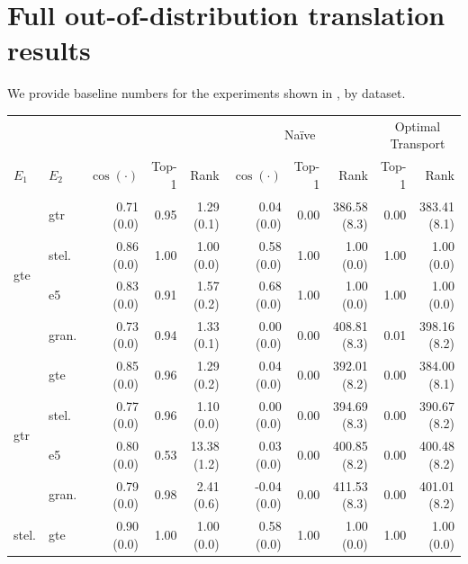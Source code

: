 \section{Full out-of-distribution translation results}
\label{sec:full_ood}
We provide baseline numbers for the experiments shown in , by dataset.
\begin{table}[!ht]
    \scriptsize
    \centering
    \begin{tabular}{llrrrrrrrr}
        \toprule
        \multicolumn{2}{c}{} & \multicolumn{3}{c}{\atk{}} & \multicolumn{3}{c}{Naïve} & \multicolumn{2}{c}{Optimal Transport}\\
        \cmidrule(lr){3-5} \cmidrule(lr){6-8}  \cmidrule(lr){9-10} 
        $E_1$ & $E_2$ & $\cos(\cdot)$ & Top-1 & Rank & $\cos(\cdot)$ & Top-1 & Rank & Top-1 & Rank\\
        \midrule
        \multirow{4}{*}{gte} & gtr & 0.71 {\tiny (0.0)} & 0.95 & 1.29 {\tiny (0.1)} & 0.04 {\tiny (0.0)} & 0.00 & 386.58 {\tiny (8.3)} & 0.00 & 383.41 {\tiny (8.1)} \\
        & stel. & 0.86 {\tiny (0.0)} & 1.00 & 1.00 {\tiny (0.0)} & 0.58 {\tiny (0.0)} & 1.00 & 1.00 {\tiny (0.0)} & 1.00 & 1.00 {\tiny (0.0)} \\
        & e5 & 0.83 {\tiny (0.0)} & 0.91 & 1.57 {\tiny (0.2)} & 0.68 {\tiny (0.0)} & 1.00 & 1.00 {\tiny (0.0)} & 1.00 & 1.00 {\tiny (0.0)} \\
        & gran. & 0.73 {\tiny (0.0)} & 0.94 & 1.33 {\tiny (0.1)} & 0.00 {\tiny (0.0)} & 0.00 & 408.81 {\tiny (8.3)} & 0.01 & 398.16 {\tiny (8.2)} \\
        \midrule
        \multirow{4}{*}{gtr} & gte & 0.85 {\tiny (0.0)} & 0.96 & 1.29 {\tiny (0.2)} & 0.04 {\tiny (0.0)} & 0.00 & 392.01 {\tiny (8.2)} & 0.00 & 384.00 {\tiny (8.1)} \\
        & stel. & 0.77 {\tiny (0.0)} & 0.96 & 1.10 {\tiny (0.0)} & 0.00 {\tiny (0.0)} & 0.00 & 394.69 {\tiny (8.3)} & 0.00 & 390.67 {\tiny (8.2)} \\
        & e5 & 0.80 {\tiny (0.0)} & 0.53 & 13.38 {\tiny (1.2)} & 0.03 {\tiny (0.0)} & 0.00 & 400.85 {\tiny (8.2)} & 0.00 & 400.48 {\tiny (8.2)} \\
        & gran. & 0.79 {\tiny (0.0)} & 0.98 & 2.41 {\tiny (0.6)} & -0.04 {\tiny (0.0)} & 0.00 & 411.53 {\tiny (8.3)} & 0.00 & 401.01 {\tiny (8.2)} \\
        \midrule
        \multirow{4}{*}{stel.} & gte & 0.90 {\tiny (0.0)} & 1.00 & 1.00 {\tiny (0.0)} & 0.58 {\tiny (0.0)} & 1.00 & 1.00 {\tiny (0.0)} & 1.00 & 1.00 {\tiny (0.0)} \\

\end{tabular}
\end{table}
